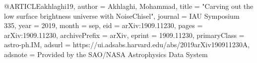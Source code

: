 @ARTICLE{akhlaghi19,
       author = {{Akhlaghi}, Mohammad},
        title = "{Carving out the low surface brightness universe with NoiseChisel}",
      journal = {IAU Symposium 335},
         year = 2019,
        month = sep,
          eid = {arXiv:1909.11230},
        pages = {arXiv:1909.11230},
archivePrefix = {arXiv},
       eprint = {1909.11230},
 primaryClass = {astro-ph.IM},
       adsurl = {https://ui.adsabs.harvard.edu/abs/2019arXiv190911230A},
      adsnote = {Provided by the SAO/NASA Astrophysics Data System}
}
